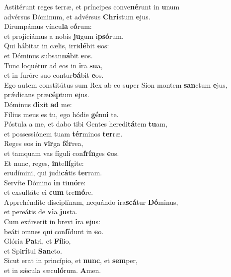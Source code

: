 \evenverse Astitérunt reges terræ, et príncipes conve\textbf{né}runt in \textbf{u}num~\*\\
\evenverse advérsus Dóminum, et advérsus \textbf{Chri}stum \textbf{e}jus.\\
\oddverse Dirumpámus víncu\textbf{la} e\textbf{ó}rum:~\*\\
\oddverse et projiciámus a nobis \textbf{ju}gum i\textbf{psó}rum.\\
\evenverse Qui hábitat in cælis, irri\textbf{dé}bit \textbf{e}os:~\*\\
\evenverse et Dóminus subsan\textbf{ná}bit \textbf{e}os.\\
\oddverse Tunc loquétur ad eos in \textbf{i}ra \textbf{su}a,~\*\\
\oddverse et in furóre suo contur\textbf{bá}bit \textbf{e}os.\\
\evenverse Ego autem constitútus sum Rex ab eo super Sion montem \textbf{san}ctum \textbf{e}jus,~\*\\
\evenverse prǽdicans præ\textbf{cép}tum \textbf{e}jus.\\
\oddverse Dóminus \textbf{di}xit \textbf{ad} me:~\*\\
\oddverse Fílius meus es tu, ego hódie \textbf{gé}nu\textbf{i} te.\\
\evenverse Póstula a me, et dabo tibi Gentes heredi\textbf{tá}tem \textbf{tu}am,~\*\\
\evenverse et possessiónem tuam \textbf{tér}minos \textbf{ter}ræ.\\
\oddverse Reges eos in \textbf{vir}ga \textbf{fér}rea,~\*\\
\oddverse et tamquam vas fíguli con\textbf{frín}ges \textbf{e}os.\\
\evenverse Et nunc, reges, \textbf{in}tel\textbf{lí}gite:~\*\\
\evenverse erudímini, qui judi\textbf{cá}tis \textbf{ter}ram.\\
\oddverse Servíte Dómino \textbf{in} ti\textbf{mó}re:~\*\\
\oddverse et exsultáte ei \textbf{cum} tre\textbf{mó}re.\\
\evenverse Apprehéndite disciplínam, nequándo ira\textbf{scá}tur \textbf{Dó}minus,~\*\\
\evenverse et pereátis de \textbf{vi}a \textbf{ju}sta.\\
\oddverse Cum exárserit in brevi \textbf{i}ra \textbf{e}jus:~\*\\
\oddverse beáti omnes qui con\textbf{fí}dunt in \textbf{e}o.\\
\evenverse Glória \textbf{Pa}tri, et \textbf{Fí}lio,~\*\\
\evenverse et Spi\textbf{rí}tui \textbf{San}cto.\\
\oddverse Sicut erat in princípio, et \textbf{nunc}, et \textbf{sem}per,~\*\\
\oddverse et in sǽcula sæcu\textbf{ló}rum. \textbf{A}men.\\
